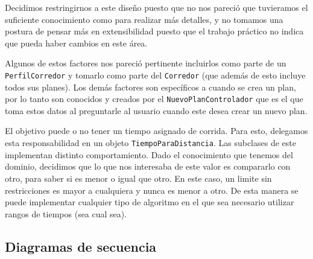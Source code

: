 \documentclass[10pt, a4paper,english,spanish]{article}
\begin{document}
Decidimos restringirnos a este diseño puesto que no nos pareció que tuvieramos el suficiente conocimiento como para realizar más detalles, y no tomamos una postura de pensar más en extensibilidad puesto que el trabajo práctico no indica que pueda haber cambios en este área.

Algunos de estos factores nos pareció pertinente incluirlos como parte de un \texttt{PerfilCorredor} y tomarlo como parte del \texttt{Corredor} (que además de esto incluye todos sus planes). Los demás factores son específicos a cuando se crea un plan, por lo tanto son conocidos y creados por el \texttt{NuevoPlanControlador} que es el que toma estos datos al preguntarle al usuario cuando este desea crear un nuevo plan.

El objetivo puede o no tener un tiempo asignado de corrida. Para esto, delegamos esta responsabilidad en un objeto \texttt{TiempoParaDistancia}. Las subclases de este implementan distinto comportamiento. Dado el conocimiento que tenemos del dominio, decidimos que lo que nos interesaba de este valor es compararlo con otro, para saber si es menor o igual que otro. En este caso, un limite sin restricciones es mayor a cualquiera y nunca es menor a otro. De esta manera se puede implementar cualquier tipo de algoritmo en el que sea necesario utilizar rangos de tiempos (sea cual sea).

\subsection{Diagramas de secuencia}


\end{document}
